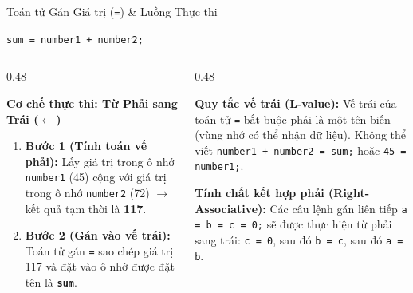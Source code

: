 \documentclass[aspectratio=169, 10pt]{beamer}
\begin{document}
\begin{frame}[fragile]{Toán tử Gán Giá trị (\texttt{=}) \& Luồng Thực thi}
  \begin{tcolorbox}[colback=CodeBg,colframe=UniNavy,title=\textbf{Câu lệnh gán: Tính toán vế phải và lưu vào vế trái},fonttitle=\small\bfseries]
    \centering
    \Large \texttt{sum = number1 + number2;}
  \end{tcolorbox}

  \begin{columns}[T]
    \begin{column}{0.48\textwidth}
      \begin{block}{\textbf{Cơ chế thực thi: Từ Phải sang Trái ($\leftarrow$)}}
        \begin{enumerate}\small
          \item \textbf{Bước 1 (Tính toán vế phải):} Lấy giá trị trong ô nhớ \texttt{number1} (45) cộng với giá trị trong ô nhớ \texttt{number2} (72) $\to$ kết quả tạm thời là \textbf{117}.
          \item \textbf{Bước 2 (Gán vào vế trái):} Toán tử gán \texttt{=} sao chép giá trị 117 và đặt vào ô nhớ được đặt tên là \textbf{\texttt{sum}}.
        \end{enumerate}
      \end{block}
    \end{column}

    \begin{column}{0.48\textwidth}
      \begin{alertblock}{\textbf{Quy tắc vế trái (L-value):}}
        Vế trái của toán tử \texttt{=} bắt buộc phải là một tên biến (vùng nhớ có thể nhận dữ liệu). Không thể viết \texttt{number1 + number2 = sum;} hoặc \texttt{45 = number1;}.
      \end{alertblock}

      \begin{exampleblock}{\textbf{Tính chất kết hợp phải (Right-Associative):}}
        Các câu lệnh gán liên tiếp \texttt{a = b = c = 0;} sẽ được thực hiện từ phải sang trái: \texttt{c = 0}, sau đó \texttt{b = c}, sau đó \texttt{a = b}.
      \end{exampleblock}
    \end{column}
  \end{columns}
\end{frame}
\end{document}
